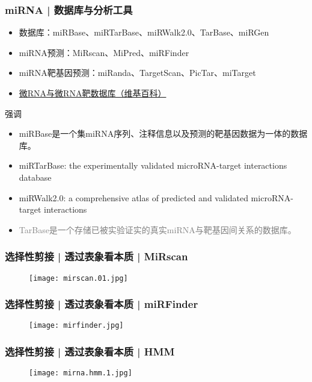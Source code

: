 \begin{frame}
  \frametitle{miRNA | 数据库与分析工具}
  \begin{itemize}
    \item 数据库：miRBase、miRTarBase、miRWalk2.0、TarBase、miRGen
    \item miRNA预测：MiRscan、MiPred、miRFinder
    \item miRNA靶基因预测：miRanda、TargetScan、PicTar、miTarget
    \item \href{http://zh.wikipedia.org/wiki/\%E5\%BE\%AERNA\%E4\%B8\%8E\%E5\%BE\%AERNA\%E9\%9D\%B6\%E6\%95\%B0\%E6\%8D\%AE\%E5\%BA\%93}{微RNA与微RNA靶数据库（维基百科）}
  \end{itemize}
  \pause
  \begin{block}{强调}
    \begin{itemize}
      \item miRBase是一个集miRNA序列、注释信息以及预测的靶基因数据为一体的数据库。
      \item miRTarBase: the experimentally validated microRNA-target interactions database
      \item miRWalk2.0: a comprehensive atlas of predicted and validated microRNA-target interactions
      \item \textcolor{gray}{TarBase是一个存储已被实验证实的真实miRNA与靶基因间关系的数据库。}
    \end{itemize}
  \end{block}
\end{frame}

\begin{frame}
  \frametitle{选择性剪接 | 透过表象看本质 | MiRscan}
  \begin{figure}
    \centering
    \texttt{[image: mirscan.01.jpg]}
  \end{figure}
\end{frame}

\begin{frame}
  \frametitle{选择性剪接 | 透过表象看本质 | miRFinder}
  \begin{figure}
    \centering
    \texttt{[image: mirfinder.jpg]}
  \end{figure}
\end{frame}

\begin{frame}
  \frametitle{选择性剪接 | 透过表象看本质 | HMM}
  \begin{figure}
    \centering
    \texttt{[image: mirna.hmm.1.jpg]}
  \end{figure}
\end{frame}

